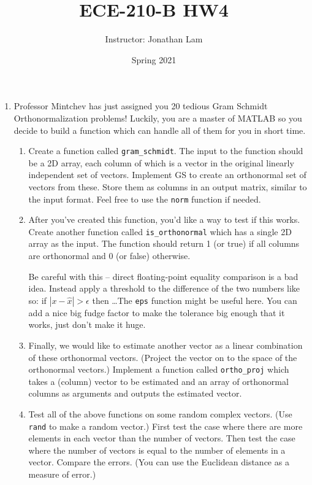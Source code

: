 \documentclass{article}
\title{ECE-210-B HW4}
\author{Instructor: Jonathan Lam}
\date{Spring 2021}
\begin{document}
	\maketitle
	
	\begin{enumerate}
		\item Professor Mintchev has just assigned you 20 tedious Gram Schmidt Orthonormalization problems! Luckily, you are a master of MATLAB so you decide to build a function which can handle all of them for you in short time.
		
		\begin{enumerate}
			\item Create a function called \lstinline|gram_schmidt|. The input to the function should be a 2D array, each column of which is a vector in the original linearly independent set of vectors. Implement GS to create an orthonormal set of vectors from these. Store them as columns in an output matrix, similar to the input format. Feel free to use the \lstinline|norm| function if needed.
			
			\item After you've created this function, you'd like a way to test if this works. Create another function called \lstinline|is_orthonormal| which has a single 2D array as the input. The function should return 1 (or true) if all columns are orthonormal and 0 (or false) otherwise.
			
			Be careful with this -- direct floating-point equality comparison is a bad idea. Instead apply a threshold to the difference of the two numbers like so: if $|x-\hat{x}|>\epsilon$ then \dots The \lstinline|eps| function might be useful here. You can add a nice big fudge factor to make the tolerance big enough that it works, just don't make it huge.
			
			\item Finally, we would like to estimate another vector as a linear combination of these orthonormal vectors. (Project the vector on to the space of the orthonormal vectors.) Implement a function called \lstinline|ortho_proj| which takes a (column) vector to be estimated and an array of orthonormal columns as arguments and outputs the estimated vector.
			
			\item Test all of the above functions on some random complex vectors. (Use \lstinline|rand| to make a random vector.) First test the case where there are more elements in each vector than the number of vectors. Then test the case where the number of vectors is equal to the number of elements in a vector. Compare the errors. (You can use the Euclidean distance as a measure of error.)
			

\end{enumerate}
\end{enumerate}
\end{document}
